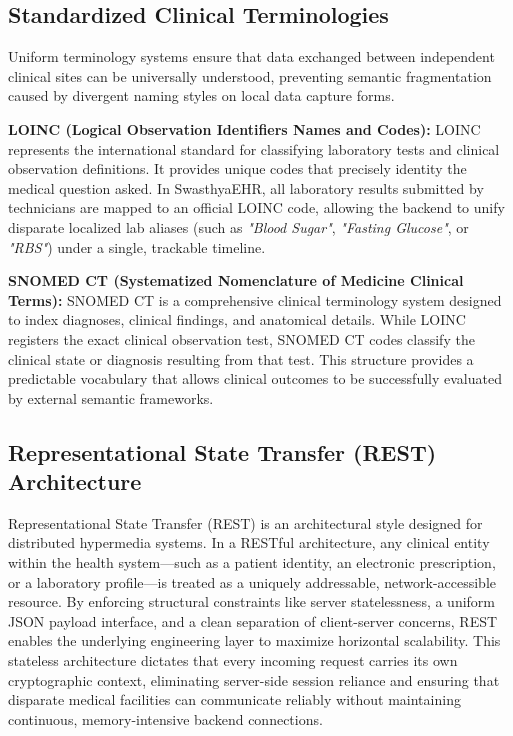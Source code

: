 \documentclass[12pt, a4paper]{report}
\numberwithin{equation}{chapter}
\begin{document}
\subsection{Standardized Clinical Terminologies}
Uniform terminology systems ensure that data exchanged between independent clinical sites can be universally understood, preventing semantic fragmentation caused by divergent naming styles on local data capture forms.

\textbf{LOINC (Logical Observation Identifiers Names and Codes):} LOINC represents the international standard for classifying laboratory tests and clinical observation definitions. It provides unique codes that precisely identity the medical question asked. In SwasthyaEHR, all laboratory results submitted by technicians are mapped to an official LOINC code, allowing the backend to unify disparate localized lab aliases (such as \textit{"Blood Sugar"}, \textit{"Fasting Glucose"}, or \textit{"RBS"}) under a single, trackable timeline.

\textbf{SNOMED CT (Systematized Nomenclature of Medicine Clinical Terms):} SNOMED CT is a comprehensive clinical terminology system designed to index diagnoses, clinical findings, and anatomical details. While LOINC registers the exact clinical observation test, SNOMED CT codes classify the clinical state or diagnosis resulting from that test. This structure provides a predictable vocabulary that allows clinical outcomes to be successfully evaluated by external semantic frameworks.

\subsection{Representational State Transfer (REST) Architecture}
Representational State Transfer (REST) is an architectural style designed for distributed hypermedia systems. In a RESTful architecture, any clinical entity within the health system—such as a patient identity, an electronic prescription, or a laboratory profile—is treated as a uniquely addressable, network-accessible resource. By enforcing structural constraints like server statelessness, a uniform JSON payload interface, and a clean separation of client-server concerns, REST enables the underlying engineering layer to maximize horizontal scalability. This stateless architecture dictates that every incoming request carries its own cryptographic context, eliminating server-side session reliance and ensuring that disparate medical facilities can communicate reliably without maintaining continuous, memory-intensive backend connections.
\end{document}
